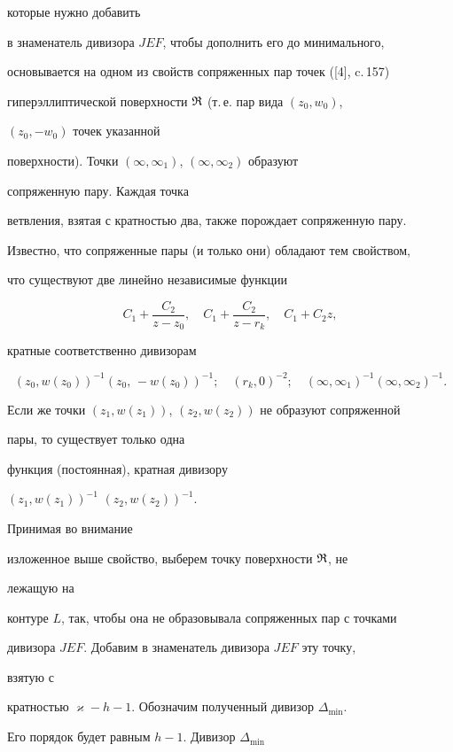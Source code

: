 которые нужно добавить 


в знаменатель дивизора $JEF$, чтобы дополнить его до минимального, 


основывается на одном из свойств сопряженных пар точек ([4], c.\,157) 


гиперэллиптической поверхности $\frak R$ (т.\,е. пар вида $(z_0,w_0)$, 


$(z_0,-w_0)$ точек указанной 


поверхности). Точки $(\infty,\infty_1)$, $(\infty,\infty_2)$ образуют 


сопряженную пару. Каждая точка 


ветвления, взятая с кратностью два, также порождает сопряженную пару. 


Известно, что сопряженные пары (и только они) обладают тем свойством, 


что существуют две линейно независимые функции 


$$ 


C_1+\frac{C_2}{z-z_0},\quad C_1+\frac{C_2}{z-r_k},\quad 


C_1+C_2z, 


$$ 


кратные соответственно дивизорам 


$$ 


(z_0,w(z_0))^{-1}(z_0,\,-w(z_0))^{-1};\quad 


(r_k,0)^{-2};\quad(\infty,\infty_1)^{-1} 


(\infty,\infty_2)^{-1}. 


$$ 


Если же точки $(z_1,w(z_1))$, $(z_2,w(z_2))$ не образуют сопряженной 


пары, то существует только одна 


функция (постоянная), кратная дивизору 


$(z_1,w(z_1))^{-1}$ $(z_2,w(z_2))^{-1}$. 


Принимая во внимание  


изложенное выше свойство, выберем точку поверхности $\frak R$, не 


лежащую на 


контуре $L$, так, чтобы она не образовывала сопряженных пар с точками 


дивизора $JEF$. Добавим в знаменатель дивизора $JEF$ эту точку, 


взятую с 


кратностью $\varkappa-h-1$. Обозначим полученный дивизор $\Delta_{\min}$. 


Его порядок будет равным $h-1$. Дивизор $\Delta_{\min}$



